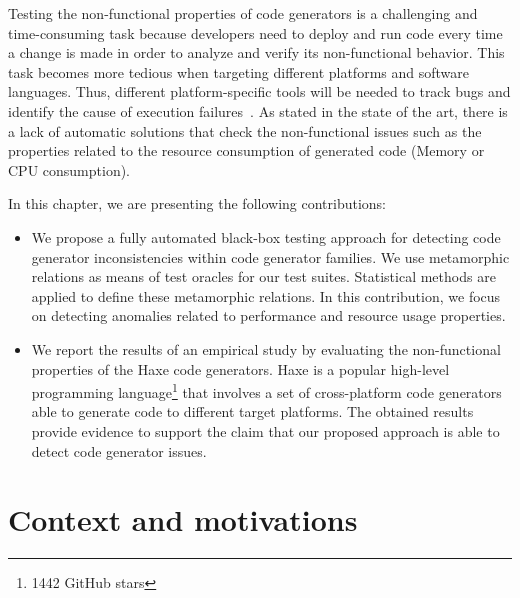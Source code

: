 Testing the non-functional properties of code generators is a challenging and time-consuming task because developers need to deploy and run code every time a change is made in order to analyze and verify its non-functional behavior.
This task becomes more tedious when targeting different platforms and software languages. Thus, different platform-specific tools will be needed to track bugs and identify the cause of execution failures~\cite{guana2014chaintracker,delgado2004taxonomy}. 
As stated in the state of the art, there is a lack of automatic solutions that check the non-functional issues such as the properties related to the resource consumption of generated code (Memory or CPU consumption).



In this chapter, we are presenting the following contributions:

\begin{itemize} 	
	
	\item We propose a fully automated black-box testing approach for detecting code generator inconsistencies within code generator families. We use metamorphic relations as means of test oracles for our test suites. 
	Statistical methods are applied to define these metamorphic relations.
	In this contribution, we focus on detecting anomalies related to performance and resource usage properties. 
	
	\item We report the results of an empirical study by evaluating the non-functional properties of the Haxe code generators. 
	Haxe is a popular high-level programming language\footnote{\num{1442} GitHub stars} that involves a set of cross-platform code generators able to generate code to different target platforms. The obtained results provide evidence to support the claim that our proposed approach is able to detect code generator issues.
	

	
\end{itemize}

\section{Context and motivations}
\label{sec:cg_Motivation}

